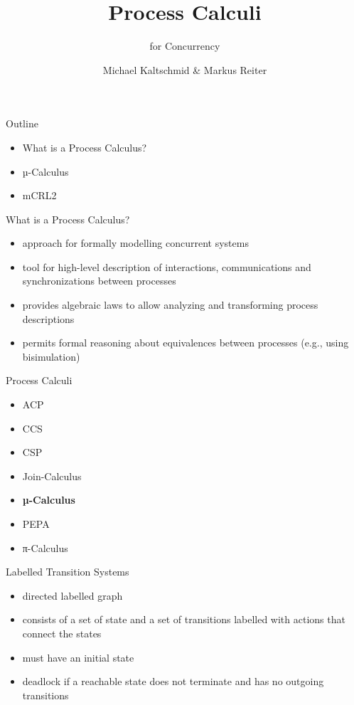 \documentclass[aspectratio=1610]{beamer}
\title{Process Calculi}
\subtitle{for Concurrency}
\author{Michael Kaltschmid \& Markus Reiter}
\date{}
\begin{document}
  \maketitle

  \begin{frame}{Outline}
    \begin{itemize}
      \item What is a Process Calculus?
      \item µ-Calculus
      \item mCRL2
    \end{itemize}
  \end{frame}

  \begin{frame}{What is a Process Calculus?}
    \begin{itemize}
      \item approach for formally modelling concurrent systems
      \item tool for high-level description of interactions, communications and synchronizations between processes
      \item provides algebraic laws to allow analyzing and transforming process descriptions
      \item permits formal reasoning about equivalences between processes (e.g., using bisimulation)
    \end{itemize}
  \end{frame}

  \begin{frame}{Process Calculi}
    \begin{itemize}
      \item ACP
      \item CCS
      \item CSP
      \item Join-Calculus
      \item \textbf{µ-Calculus}
      \item PEPA
      \item π-Calculus
    \end{itemize}
  \end{frame}

  \begin{frame}{Labelled Transition Systems}
    \begin{itemize}
      \item directed labelled graph \\
      \item consists of a set of state and a set of transitions labelled with actions that connect the states \\
      \item must have an initial state \\
      \item deadlock if a reachable state does not terminate and has no outgoing transitions \\
    \end{itemize}
  \end{frame}
\end{document}
